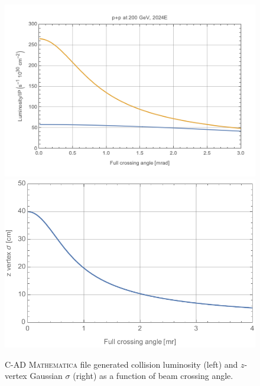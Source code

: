 \begin{figure}[h!]
    \centering
        \includegraphics[width=0.7\linewidth]{figs/figure_cad2_prelim.png}  
    \includegraphics[width=0.62\linewidth]{figs/pp200-2023-202008131-z.pdf}
    \caption{C-AD {\textsc{Mathematica}} file generated \pp collision luminosity (left) and $z$-vertex Gaussian $\sigma$ (right) as a function of beam crossing angle.}
    \label{fig:mathpp1}
\end{figure}

